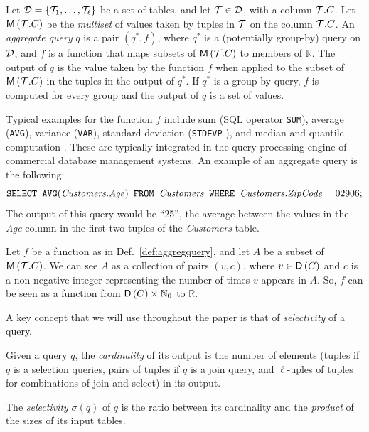 \begin{definition}\label{def:aggregquery}
  Let ${\cal D}=\{{\cal T}_1,\dotsc,{\cal T}_\ell\}$ be a set of tables, and let ${\cal T}\in {\cal D}$,
  with a column ${\cal T}.C$. Let $\mathsf{M}\left({\cal T}.C\right)$ be the \emph{multiset} of
  values taken by tuples in ${\cal T}$ on the column ${\cal T}.C$. An \emph{aggregate
  query} $q$ is a pair $(q^*,f)$, where $q^*$ is a (potentially group-by) query
  on ${\cal D}$, and $f$ is a function that maps subsets of $\mathsf{M}\left({\cal T}.C\right)$ to members
  of $\mathbb{R}$. The output of $q$ is the value taken by the function $f$ when
  applied to the subset of $\mathsf{M}\left({\cal T}.C\right)$ in the tuples in the output of $q^*$. If
  $q^*$ is a group-by query, $f$ is computed for every group and the output of
  $q$ is a set of values.  
\end{definition}
Typical examples for the function $f$ include sum (SQL operator \texttt{SUM}),
average (\texttt{AVG}), variance (\texttt{VAR}), standard
deviation (\texttt{STDEVP} ), and median
and quantile computation .
These are typically integrated in the query processing engine of commercial
database management systems. An example of an aggregate query is the following:
\[
\mbox{\texttt{SELECT }} \mbox{\texttt{AVG}}(\mbox{\emph{Customers.Age}}) \mbox{\texttt{ FROM }}
\mbox{\emph{Customers}} \mbox{\texttt{ WHERE }} \mbox{\emph{Customers.ZipCode}} = 02906;
\]
The output of this query would be ``25'', the average between the values in the
\emph{Age} column in the first two tuples of the \emph{Customers} table.

\begin{fact}\label{fact:aggregquery}
  Let $f$ be a function as in Def.~\ref{def:aggregquery}, and let $A$ be a 
  subset of $\mathsf{M}\left({\cal T}.C\right)$. We can see $A$ as a collection of pairs $(v,c)$,
  where $v\in \mathsf{D}\left(C\right)$ and $c$ is a non-negative integer representing the number of
  times $v$ appears in $A$. So, $f$ can be seen as a function from
  $\mathsf{D}\left(C\right)\times\mathbb{N}_0$ to $\mathbb{R}$.
\end{fact}

A key concept that we will use throughout the paper is that of
\emph{selectivity} of a query. 

\begin{definition}\label{def:cardsel}
  Given a query $q$, the \emph{cardinality} of its output is the number of
  elements (tuples if $q$ is a selection queries, pairs of tuples if $q$ is a
  join query, and $\ell$-uples of tuples for combinations of join and select)
  in its output.

  The \emph{selectivity} $\sigma(q)$ of $q$ is the ratio between its cardinality
  and the \emph{product} of the sizes of its input tables.
\end{definition}

